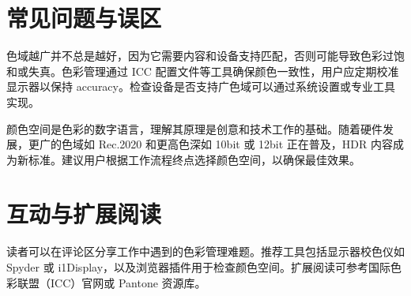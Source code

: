 \chapter{常见问题与误区}
色域越广并不总是越好，因为它需要内容和设备支持匹配，否则可能导致色彩过饱和或失真。色彩管理通过 ICC 配置文件等工具确保颜色一致性，用户应定期校准显示器以保持 accuracy。检查设备是否支持广色域可以通过系统设置或专业工具实现。\par
颜色空间是色彩的数字语言，理解其原理是创意和技术工作的基础。随着硬件发展，更广的色域如 Rec.2020 和更高色深如 10bit 或 12bit 正在普及，HDR 内容成为新标准。建议用户根据工作流程终点选择颜色空间，以确保最佳效果。\par
\chapter{互动与扩展阅读}
读者可以在评论区分享工作中遇到的色彩管理难题。推荐工具包括显示器校色仪如 Spyder 或 i1Display，以及浏览器插件用于检查颜色空间。扩展阅读可参考国际色彩联盟（ICC）官网或 Pantone 资源库。\par

